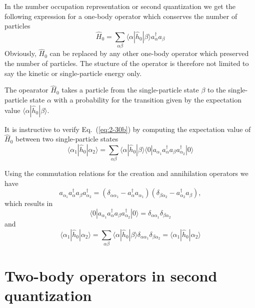 In the number occupation representation or second quantization we get the following expression for a one-body 
operator which conserves the number of particles
\begin{equation}
	\hat{H}_0 = \sum_{\alpha\beta} \langle \alpha|\hat{h}_0|\beta\rangle a_\alpha^{\dagger} a_\beta \label{eq:2-30b}
\end{equation}
Obviously, $\hat{H}_0$ can be replaced by any other one-body  operator which preserved the number
of particles. The stucture of the operator is therefore not limited to say the kinetic or single-particle energy only.

The opearator $\hat{H}_0$ takes a particle from the single-particle state $\beta$  to the single-particle state $\alpha$ 
with a probability for the transition given by the expectation value $\langle \alpha|\hat{h}_0|\beta\rangle$.

It is instructive to verify Eq.~(\ref{eq:2-30b}) by computing the expectation value of $\hat{H}_0$ 
between two single-particle states
\begin{equation}
	\langle \alpha_1|\hat{h}_0|\alpha_2\rangle = \sum_{\alpha\beta} \langle \alpha|\hat{h}_0|\beta\rangle
		\langle 0|a_{\alpha_1}a_\alpha^{\dagger} a_\beta a_{\alpha_2}^{\dagger}|0\rangle \label{eq:2-30c}
\end{equation}

Using the commutation relations for the creation and annihilation operators we have 
\begin{equation}
a_{\alpha_1}a_\alpha^{\dagger} a_\beta a_{\alpha_2}^{\dagger} = (\delta_{\alpha \alpha_1} - a_\alpha^{\dagger} a_{\alpha_1} )(\delta_{\beta \alpha_2} - a_{\alpha_2}^{\dagger} a_{\beta} ), \label{eq:2-30d}
\end{equation}
which results in
\begin{equation}
\langle 0|a_{\alpha_1}a_\alpha^{\dagger} a_\beta a_{\alpha_2}^{\dagger}|0\rangle = \delta_{\alpha \alpha_1} \delta_{\beta \alpha_2} \label{eq:2-30e}
\end{equation}
and
\begin{equation}
\langle \alpha_1|\hat{h}_0|\alpha_2\rangle = \sum_{\alpha\beta} \langle \alpha|\hat{h}_0|\beta\rangle\delta_{\alpha \alpha_1} \delta_{\beta \alpha_2} = \langle \alpha_1|\hat{h}_0|\alpha_2\rangle \label{eq:2-30f}
\end{equation}

\section{Two-body operators in second quantization}

